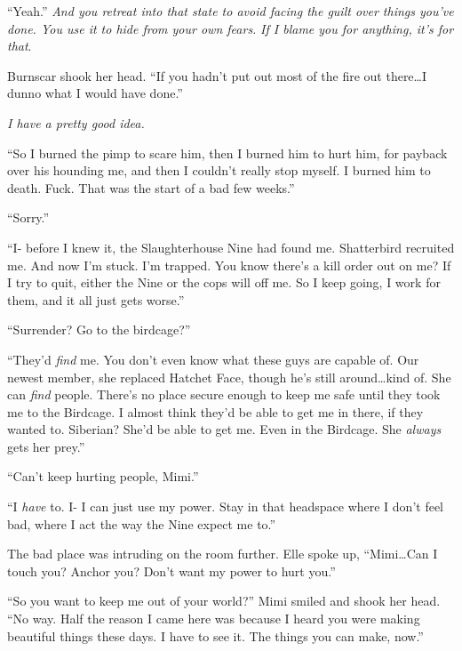 ``Yeah.''  \emph{And you retreat into that state to avoid facing the guilt over things you've done.  You use it to hide from your own fears.  }\emph{If I blame you for anything, it's for that}.



Burnscar shook her head.  ``If you hadn't put out most of the fire out there\ldots I dunno what I would have done.''



\emph{I have a pretty good idea.}



``So I burned the pimp to scare him, then I burned him to hurt him, for payback over his hounding me, and then I couldn't really stop myself.  I burned him to death.  Fuck. That was the start of a bad few weeks.''



``Sorry.''



``I- before I knew it, the Slaughterhouse Nine had found me.  Shatterbird recruited me.  And now I'm stuck.  I'm trapped.  You know there's a kill order out on me?  If I try to quit, either the Nine or the cops will off me.  So I keep going, I work for them, and it all just gets worse.''



``Surrender?  Go to the birdcage?''



``They'd \emph{find} me.  You don't even know what these guys are capable of.  Our newest member, she replaced Hatchet Face, though he's still around\ldots kind of.  She can \emph{find} people.  There's no place secure enough to keep me safe until they took me to the Birdcage.  I almost think they'd be able to get me in there, if they wanted to.  Siberian?  She'd be able to get me.   Even in the Birdcage.  She \emph{always} gets her prey.''



``Can't keep hurting people, Mimi.''



``I \emph{have} to.  I- I can just use my power.  Stay in that headspace where I don't feel bad, where I act the way the Nine expect me to.''



The bad place was intruding on the room further.  Elle spoke up, ``Mimi\ldots  Can I touch you?  Anchor you?  Don't want my power to hurt you.''



``So you want to keep me out of your world?''  Mimi smiled and shook her head.  ``No way.  Half the reason I came here was because I heard you were making beautiful things these days.  I have to see it.  The things you can make, now.''



